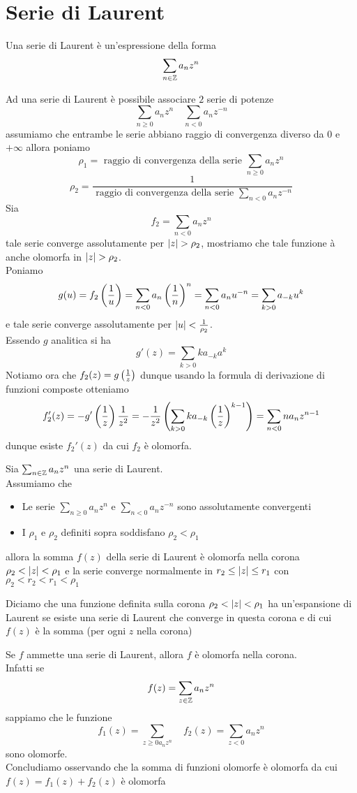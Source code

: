 \section{Serie di Laurent}
\begin{defn}Una serie di Laurent \`e un'espressione della forma 
$$ \sum_{n \in \mathbb{Z}} a_n z^n$$
\end{defn}
Ad una serie di Laurent \`e possibile associare $2$ serie di potenze
$$ \sum_{n\geq 0 } a_n z^n \quad \sum_{n<0} a_n z^{-n}$$
assumiamo che entrambe le serie abbiano raggio di convergenza diverso da $0$ e $+\infty$ allora poniamo 
$$ \rho_1=\text{ raggio di convergenza della serie } \sum_{n\geq 0 } a_n z^n$$
$$ \rho_2=\frac{1}{\text{ raggio di convergenza della serie } \sum_{n< 0 } a_n z^{-n}}$$
Sia 
$$ f_2 =\sum_{n<0} a_n z^n$$
tale serie converge assolutamente per $\left\vert z \right\vert >\rho_2$, mostriamo che tale funzione \`a anche olomorfa in $\left\vert z \right\vert>\rho_2$.\\
Poniamo 
$$g(u)=f_2\left( \frac{1}{u} \right) =\sum_{n<0} a_n \left( \frac{1}{n} \right)^n =\sum_{n<0} a_n u^{-n} = \sum_{k>0} a_{-k} u^k$$
e tale serie converge assolutamente per $\left\vert u \right\vert < \frac{1}{\rho_2}$.\\
Essendo $g$ analitica si ha 
$$ g'(z) = \sum_{k>0} k a_{-k} a^k$$
Notiamo ora  che $f_2(z) = g\left( \frac{1}{z} \right)$ dunque usando la formula di derivazione di funzioni composte otteniamo 
$$f_2'(z) = -g'\left( \frac{1}{z} \right) \frac{1}{z^2} =-\frac{1}{z^2} \left( \sum_{k>0} ka_{-k} \left(\frac{1}{z}\right)^{k-1} \right) = \sum_{n<0} na_n z^{n-1} $$
dunque esiste $f_2'(z)$ da cui $f_2$ \`e olomorfa.
\spazio
\begin{prop}Sia $\sum_{n\in \mathbb{Z}}a_n z^n$ una serie di Laurent.\\
Assumiamo che 
\begin{itemize}
\item Le serie $\sum_{n \geq 0 } a_n z^n$ e $\sum_{n<0} a_nz^{-n}$ sono assolutamente convergenti
\item I $\rho_1$ e $\rho_2$ definiti sopra soddisfano $\rho_2<\rho_1$
\end{itemize}
allora la somma $f(z)$ della serie di Laurent \`e olomorfa nella corona $\rho_2< \left\vert z \right\vert <\rho_	1$ e la serie converge normalmente in $r_2\leq\left\vert z \right\vert \leq r_1$ con $\rho_2<r_2<r_1<\rho_1$
\end{prop}
\begin{defn}Diciamo che una funzione definita sulla corona $\rho_2<\left\vert z \right\vert<\rho_1$ ha un'espansione di Laurent se esiste una serie di Laurent che converge in questa corona e di cui $f(z)$ \`e la somma (per ogni $z$ nella corona)
\end{defn}
\begin{oss}Se $f$ ammette una serie di Laurent, allora $f$ \`e olomorfa nella corona.\\
Infatti se 
$$ f(z) = \sum_{z\in \mathbb{Z}} a_n z^n$$ 
sappiamo che le funzione $$f_1(z)=\sum_{z\geq 0 a_n z^n} \quad f_2(z)=\sum_{z<0} a_n z^n$$ sono olomorfe.\\
Concludiamo osservando che la somma di funzioni olomorfe \`e olomorfa da cui $f(z) = f_1(z) +f_2(z)$ \`e olomorfa 
\end{oss}

 